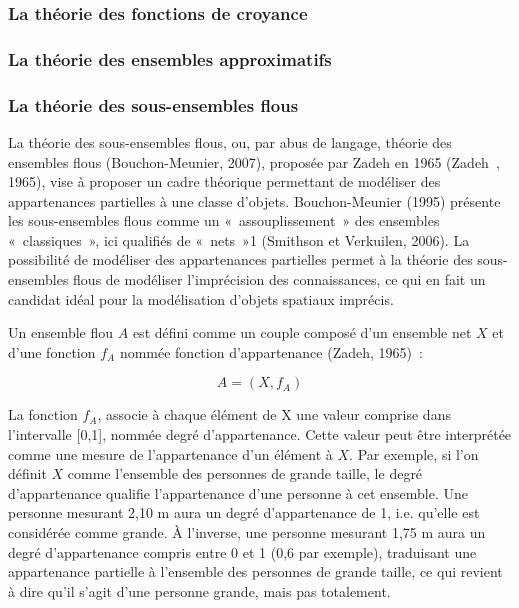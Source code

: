 \subsubsection{La théorie des fonctions de croyance}


\subsubsection{La théorie des ensembles approximatifs}


\subsubsection{La théorie des sous-ensembles flous}

La théorie des sous-ensembles flous, ou, par abus de langage, théorie
des ensembles flous (Bouchon-Meunier, 2007), proposée par Zadeh en
1965 (Zadeh , 1965), vise à proposer un cadre théorique permettant de
modéliser des appartenances partielles à une classe
d’objets. Bouchon-Meunier (1995) présente les sous-ensembles flous
comme un « assouplissement » des ensembles « classiques », ici
qualifiés de « nets »1 (Smithson et Verkuilen, 2006). La possibilité
de modéliser des appartenances partielles permet à la théorie des
sous-ensembles flous de modéliser l’imprécision des connaissances, ce
qui en fait un candidat idéal pour la modélisation d’objets spatiaux
imprécis.

Un ensemble flou $A$ est défini comme un couple composé d’un ensemble
net $X$ et d’une fonction $f_A$ nommée fonction d’appartenance (Zadeh,
1965) :

\begin{equation}
A = (X, f_A)  
\end{equation}

La fonction $f_A$, associe à chaque élément de X une valeur comprise
dans l’intervalle [0,1], nommée degré d’appartenance. Cette valeur
peut être interprétée comme une mesure de l’appartenance d’un élément
à $X$. Par exemple, si l’on définit $X$ comme l’ensemble des personnes
de grande taille, le degré d’appartenance qualifie l’appartenance
d’une personne à cet ensemble. Une personne mesurant 2,10 m aura un
degré d’appartenance de 1, i.e. qu’elle est considérée comme grande. À
l’inverse, une personne mesurant 1,75 m aura un degré d’appartenance
compris entre 0 et 1 (0,6 par exemple), traduisant une appartenance
partielle à l’ensemble des personnes de grande taille, ce qui revient
à dire qu’il s’agit d’une personne grande, mais pas totalement.

